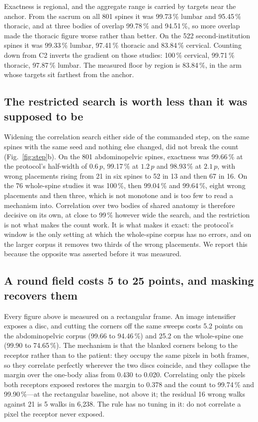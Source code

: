 \documentclass[11pt,letterpaper]{article}
\begin{document}
Exactness is regional, and the aggregate range is carried by targets near the anchor. From the sacrum on
all 801 spines it was 99.73\,\% lumbar and 95.45\,\% thoracic, and at three bodies of overlap 99.78\,\% and
94.51\,\%, so more overlap made the thoracic figure worse rather than better. On the 522
second-institution spines it was 99.33\,\% lumbar, 97.41\,\% thoracic and 83.84\,\% cervical. Counting down
from C2 inverts the gradient on those studies: 100\,\% cervical, 99.71\,\% thoracic, 97.87\,\% lumbar. The
measured floor by region is 83.84\,\%, in the arm whose targets sit farthest from the anchor.

\subsection*{The restricted search is worth less than it was supposed to be}
Widening the correlation search either side of the commanded step, on the same spines with the same seed
and nothing else changed, did not break the count (Fig.~\ref{fig:step}b). On the 801 abdominopelvic
spines, exactness was 99.66\,\% at the protocol's half-width of $0.6\,p$, 99.17\,\% at $1.2\,p$ and
98.93\,\% at $2.1\,p$, with wrong placements rising from 21 in six spines to 52 in 13 and then 67 in 16.
On the 76 whole-spine studies it was 100\,\%, then 99.04\,\% and 99.64\,\%, eight wrong placements and
then three, which is not monotone and is too few to read a mechanism into. Correlation over two bodies of
shared anatomy is therefore decisive on its own, at close to 99\,\% however wide the search, and the
restriction is not what makes the count work. It is what makes it exact: the protocol's window is the only
setting at which the whole-spine corpus has no errors, and on the larger corpus it removes two thirds of
the wrong placements. We report this because the opposite was asserted before it was measured.

\subsection*{A round field costs 5 to 25 points, and masking recovers them}
Every figure above is measured on a rectangular frame. An image intensifier exposes a disc, and cutting
the corners off the same sweeps costs 5.2 points on the abdominopelvic corpus (99.66 to 94.46\,\%) and
25.2 on the whole-spine one (99.90 to 74.65\,\%). The mechanism is that the blanked corners belong to the
receptor rather than to the patient: they occupy the same pixels in both frames, so they correlate
perfectly wherever the two discs coincide, and they collapse the margin over the one-body alias from
0.430 to 0.020. Correlating only the pixels both receptors exposed restores the margin to 0.378 and the
count to 99.74\,\% and 99.90\,\%---at the rectangular baseline, not above it; the residual 16 wrong walks
against 21 is 5 walks in 6{,}238. The rule has no tuning in it: do not correlate a pixel the receptor
never exposed.
\end{document}
